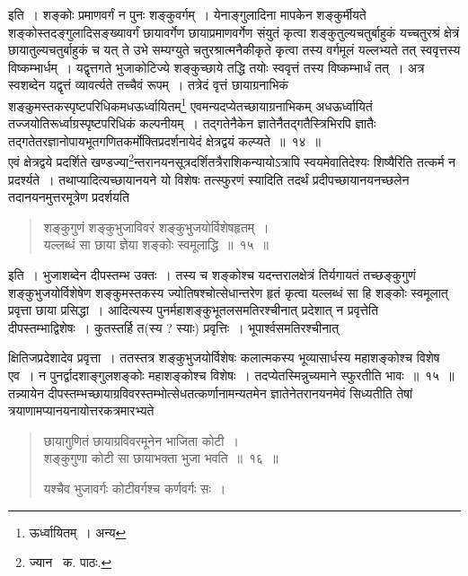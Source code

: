 \documentclass[11pt, openany]{book}
\begin{document}
इति~। शङ्कोः प्रमाणवर्गं न पुनः शङ्कुवर्गम्~। येनाङ्गुलादिना मापकेन शङ्कुर्मीयते शङ्कोस्तदङ्गुलादिसङ्ख्यावर्गं छायावर्गेण छायाप्रमाणवर्गेण संयुतं कृत्वा शङ्कुतुल्यचतुर्बाहुकं यच्चतुरश्रं क्षेत्रं छायातुल्यचतुर्बाहुकं च यत् ते उभे सम्यग्युते चतुरश्रात्मनैकीकृते कृत्वा तस्य वर्गमूलं यल्लभ्यते
तत् स्ववृत्तस्य विष्कम्भार्धम्~। यद्वृत्तगते भुजाकोटिज्ये शङ्कुच्छाये तद्धि तयोः स्ववृत्तं तस्य विष्कम्भार्धं तत्~। अत्र स्वशब्देन यद्वृत्तं
व्यावर्त्यते तच्चैवं रूपम्~। तत्रेदं वृत्तं छायाग्रनाभिकं शङ्कुमस्तकस्पृष्टपरिधिकमधऊर्ध्वायितम्\renewcommand{\thefootnote}{३}\footnote{ऊर्ध्वायितम्~। अन्य} एवमन्यदप्येतच्छायाग्रनाभिकम् अधऊर्ध्वायितं तज्जयोतिरूर्ध्वाग्रस्पृष्टपरिधिकं कल्पनीयम्~। तद्गतेनैकेन ज्ञातेनैतद्गतैस्त्रिभिरपि ज्ञातैः तद्गतेतरज्ञानोपायभूतगणितकर्मोक्तिप्रदर्शनायेदं क्षेत्रद्वयं कल्प्यते~॥~१४~॥\\

एवं क्षेत्रद्वये प्रदर्शिते खण्डज्या\renewcommand{\thefootnote}{४}\footnote{ज्यान \textendash\ क. पाठः.}न्तरानयनसूत्रदर्शितत्रैराशिकन्यायोऽत्रापि स्वयमेवातिदेश्यः शिष्यैरिति तत्कर्म न प्रदर्श्यते~। तथाप्यादित्यच्छायानयने यो विशेषः तत्स्फुरणं स्यादिति तदर्थं प्रदीपच्छायानयनच्छलेन तदानयनमुत्तरमूत्रेण प्रदर्शयति\textendash

\begin{quote}
{\ab शङ्कुगुणं शङ्कुभुजाविवरं शङ्कुभुजयोर्विशेषहृतम्~।\\
यल्लब्धं सा छाया ज्ञेया शङ्कोः स्वमूलाद्धि~॥~१५~॥}
\end{quote}

इति~। भुजाशब्देन दीपस्तम्भ उक्तः~। तस्य च शङ्कोश्च यदन्तरालक्षेत्रं तिर्यगायतं तच्छङ्कुगुणं शङ्कुभुजयोर्विशेषेण शङ्कुमस्तकस्य
ज्योतिषश्चोत्सेधान्तरेण हृतं कृत्वा यल्लब्धं सा हि शङ्कोः स्वमूलात् प्रवृत्ता छाया प्रसिद्धा~। आदित्यस्य पुनर्महाशङ्कुभूतलसमतिरश्चीनात् प्रदेशात् न प्रवृत्तेति दीपस्तम्भाद्विशेषः~। कुतस्तर्हि त(स्य ? स्याः) प्रवृत्तिः~। भूपार्श्वसमतिरश्चीनात्

\newpage

\noindent क्षितिजप्रदेशादेव प्रवृत्ता~। ततस्तत्र शङ्कुभुजयोर्विशेषः कलात्मकस्य भूव्यासार्धस्य महाशङ्कोश्च विशेष एव~। न पुनर्द्वादशाङ्गुलशङ्कोः
महाशङ्कोश्च विशेषः~। तदप्येतस्मिन्नुच्यमाने स्फुरतीति भावः~॥~१५~॥\\

तन्न्यायेन दीपस्तम्भच्छायाग्रविवरस्तम्भोत्सेधतत्कर्णानामन्यतमेन ज्ञातेनेतरानयनमेवं सिध्यतीति तेषां त्रयाणामप्यानयनायोत्तरकत्रमारभ्यते\textendash

\begin{quote}
{\ab छायागुणितं छायाग्रविवरमूनेन भाजिता कोटी~।\\
शङ्कुगुणा कोटी सा छायाभक्ता भुजा भवति~॥~१६~॥

यश्चैव भुजावर्गः कोटीवर्गश्च कर्णवर्गः सः~।}
\end{quote}
\end{document}
